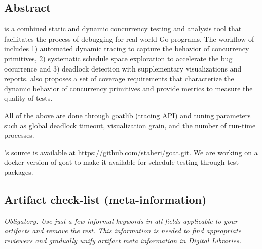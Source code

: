 


\subsection{Abstract}

\goat is a combined static and dynamic concurrency testing and analysis tool that facilitates the process of debugging for real-world Go programs.
%
The workflow of \goat includes
1) automated dynamic tracing to capture the behavior of concurrency primitives,
2) systematic schedule space exploration to accelerate the bug occurrence
and 3) deadlock detection with supplementary visualizations and reports.
\goat also proposes a set of coverage requirements that characterize the dynamic behavior of concurrency primitives and provide metrics to measure the quality of tests.

All of the above are done through \textsf{goatlib} (tracing API) and tuning parameters such as global deadlock timeout, visualization grain, and the number of run-time processes.

\goat's source is available at \textsf{https://github.com/staheri/goat.git}.
We are working on a docker version of goat to make it available for schedule testing through test packages.

\subsection{Artifact check-list (meta-information)}

{\em Obligatory. Use just a few informal keywords in all fields applicable to your artifacts
and remove the rest. This information is needed to find appropriate reviewers and gradually
unify artifact meta information in Digital Libraries.}

